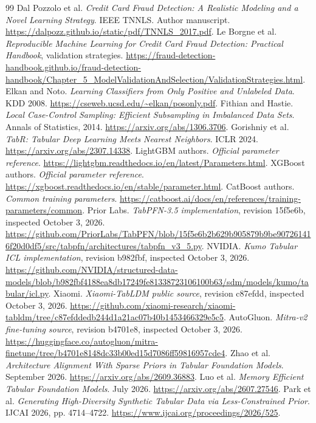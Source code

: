 \documentclass[11pt]{article}
\begin{document}
\begin{thebibliography}{99}
 Dal Pozzolo et al. \emph{Credit Card Fraud Detection: A Realistic Modeling and a Novel Learning Strategy}. IEEE TNNLS. Author manuscript. \url{https://dalpozz.github.io/static/pdf/TNNLS_2017.pdf}.
 Le Borgne et al. \emph{Reproducible Machine Learning for Credit Card Fraud Detection: Practical Handbook}, validation strategies. \url{https://fraud-detection-handbook.github.io/fraud-detection-handbook/Chapter_5_ModelValidationAndSelection/ValidationStrategies.html}.
 Elkan and Noto. \emph{Learning Classifiers from Only Positive and Unlabeled Data}. KDD 2008. \url{https://cseweb.ucsd.edu/~elkan/posonly.pdf}.
 Fithian and Hastie. \emph{Local Case-Control Sampling: Efficient Subsampling in Imbalanced Data Sets}. Annals of Statistics, 2014. \url{https://arxiv.org/abs/1306.3706}.
 Gorishniy et al. \emph{TabR: Tabular Deep Learning Meets Nearest Neighbors}. ICLR 2024. \url{https://arxiv.org/abs/2307.14338}.
 LightGBM authors. \emph{Official parameter reference}. \url{https://lightgbm.readthedocs.io/en/latest/Parameters.html}.
 XGBoost authors. \emph{Official parameter reference}. \url{https://xgboost.readthedocs.io/en/stable/parameter.html}.
 CatBoost authors. \emph{Common training parameters}. \url{https://catboost.ai/docs/en/references/training-parameters/common}.
 Prior Labs. \emph{TabPFN-3.5 implementation}, revision 15f5e6b, inspected October 3, 2026. \url{https://github.com/PriorLabs/TabPFN/blob/15f5e6b2b629b905879b9be907261416f20d0df5/src/tabpfn/architectures/tabpfn_v3_5.py}.
 NVIDIA. \emph{Kumo Tabular ICL implementation}, revision b982fbf, inspected October 3, 2026. \url{https://github.com/NVIDIA/structured-data-models/blob/b982fbf4188ea8db17249fe81338723106100b63/sdm/models/kumo/tabular/icl.py}.
 Xiaomi. \emph{Xiaomi-TabLDM public source}, revision c87efdd, inspected October 3, 2026. \url{https://github.com/xiaomi-research/xiaomi-tabldm/tree/c87efddedb244d1a21ac07b40b1453466329e5c5}.
 AutoGluon. \emph{Mitra-v2 fine-tuning source}, revision b4701e8, inspected October 3, 2026. \url{https://huggingface.co/autogluon/mitra-finetune/tree/b4701e8148dc33b00ed15d7086ff59816957cde4}.
 Zhao et al. \emph{Architecture Alignment With Sparse Priors in Tabular Foundation Models}. September 2026. \url{https://arxiv.org/abs/2609.36883}.
 Luo et al. \emph{Memory Efficient Tabular Foundation Models}. July 2026. \url{https://arxiv.org/abs/2607.27546}.
 Park et al. \emph{Generating High-Diversity Synthetic Tabular Data via Less-Constrained Prior}. IJCAI 2026, pp. 4714--4722. \url{https://www.ijcai.org/proceedings/2026/525}.
\end{thebibliography}
\end{document}

